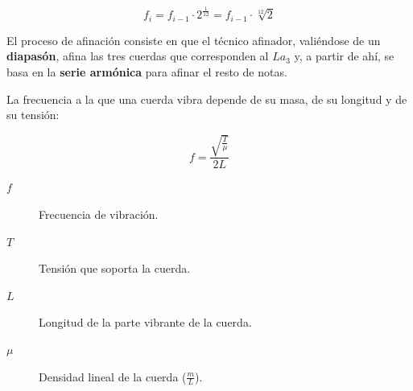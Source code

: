 \documentclass[10pt,a4paper]{article}
\begin{document}
	\begin{equation}
		f_i = f_{i-1} \cdot 2^{\frac{1}{12}} = f_{i-1} \cdot \sqrt[12]{2}
	\end{equation}
	
	El proceso de afinación consiste en que el técnico afinador, valiéndose de 
	un \textbf{diapasón}, afina las tres cuerdas que corresponden al $La_3$ y, 
	a partir de ahí, se basa en la \textbf{serie armónica} para afinar el resto 
	de notas.
	
	La frecuencia a la que una cuerda vibra depende de su masa, de su longitud 
	y de su tensión: \cite{cuerda}
	
	\begin{equation}
		f = \frac{\sqrt{\frac{T}{\mu}}}{2L}
	\end{equation}
	
	\begin{description}
		\item[$f$] Frecuencia de vibración.
		\item[$T$] Tensión que soporta la cuerda.
		\item[$L$] Longitud de la parte vibrante de la cuerda.
		\item[$\mu$] Densidad lineal de la cuerda ($\frac{m}{L}$).
	\end{description}
	
	
	\clearpage
	
	\nocite{piano}
	
\end{document}
